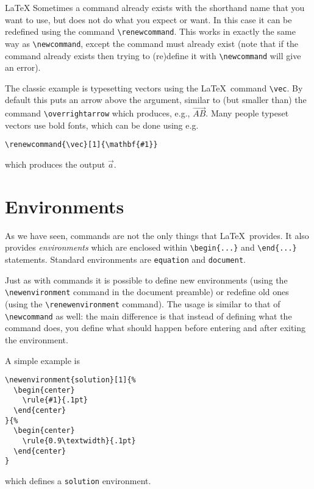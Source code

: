 \begin{chapter}{\LaTeX}
Sometimes a command already exists with the shorthand name that you want to use, but does not do what you expect or want. In this case it can be redefined using the command \verb|\renewcommand|. This works in exactly the same way as \verb|\newcommand|, except the command must already exist (note that if the command already exists then trying to (re)define it with \verb|\newcommand| will give an error).

The classic example is typesetting vectors using the \LaTeX\ command \verb|\vec|. By default this puts an arrow above the argument, similar to (but smaller than) the command \verb|\overrightarrow| which produces, e.g., $\overrightarrow{AB}$. Many people typeset vectors use bold fonts, which can be done using e.g.\
%
\begin{center}
  \verb|\renewcommand{\vec}[1]{\mathbf{#1}}|
\end{center}
%
which produces the output $\vec{a}$.

\section{Environments}
\label{sec:environments}

As we have seen, commands are not the only things that \LaTeX\ provides. It also provides \emph{environments} which are enclosed within \verb|\begin{...}| and \verb|\end{...}| statements. Standard environments are \verb|equation| and \verb|document|.

Just as with commands it is possible to define new environments (using the \verb|\newenvironment| command in the document preamble) or redefine old ones (using the \verb|\renewenvironment| command). The usage is similar to that of \verb|\newcommand| as well: the main difference is that instead of defining what the command does, you define what should happen before entering and after exiting the environment.

A simple example is
%
\begin{verbatim}
\newenvironment{solution}[1]{%
  \begin{center}
    \rule{#1}{.1pt}
  \end{center}
}{%
  \begin{center}
    \rule{0.9\textwidth}{.1pt}
  \end{center}
}
\end{verbatim}
%
which defines a \verb|solution| environment.


\end{chapter}
